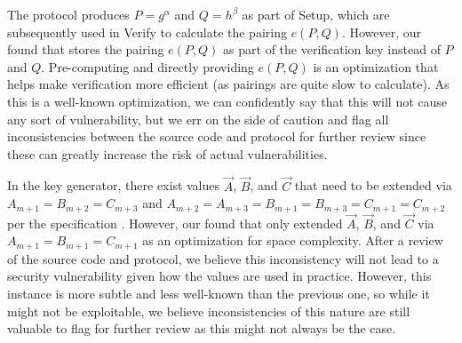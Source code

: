 The  protocol produces $P = g^{\alpha}$ and $Q = h^{\beta}$ as part of \textsf{Setup}, which are subsequently used in \textsf{Verify} to calculate the pairing $e(P, Q)$. However, our  found that \bellman stores the pairing $e(P, Q)$ as part of the verification key instead of $P$ and $Q$. Pre-computing and directly providing $e(P, Q)$ is an optimization that helps make verification more efficient (as pairings are quite slow to calculate).  As this is a well-known optimization, we can confidently say that this will not cause any sort of vulnerability, but we err on the side of caution and flag all inconsistencies between the source code and protocol for further review since these can greatly increase the risk of actual vulnerabilities.

In the \pinocchio key generator, there exist values $\overrightarrow{A}$, $\overrightarrow{B}$, and $\overrightarrow{C}$ that need to be extended via $A_{m+1} = B_{m+2} = C_{m+3}$ and $A_{m+2} = A_{m+3} = B_{m+1} = B_{m+3} = C_{m+1} = C_{m+2}$ per the specification \cite{ben2014succinct}. However, our  found that \libsnark only extended $\overrightarrow{A}$, $\overrightarrow{B}$, and $\overrightarrow{C}$ via $A_{m+1} = B_{m+1} = C_{m+1}$ as an optimization for space complexity. After a review of the \libsnark source code and protocol, we believe this inconsistency will not lead to a security vulnerability given how the values are used in practice.  However, this instance is more subtle and less well-known than the previous one, so while it might not be exploitable, we believe inconsistencies of this nature are still valuable to flag for further review as this might not always be the case.

